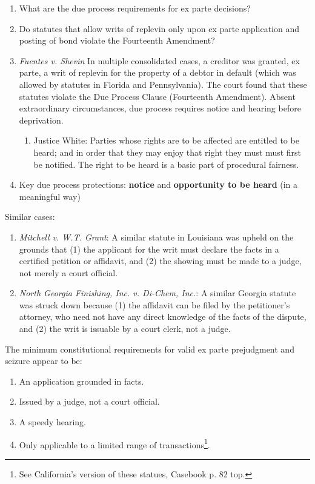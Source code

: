 \begin{enumerate}
    \item What are the due process requirements for ex parte decisions?
    \item Do statutes that allow writs of replevin only upon ex parte 
    application and posting of bond violate the Fourteenth Amendment?
    \item \emph{Fuentes v. Shevin} In multiple consolidated cases, a creditor 
    was granted, ex parte, a writ of replevin for the property of a debtor in 
    default (which was allowed by statutes in Florida and Pennsylvania). The 
    court found that these statutes violate the Due Process Clause (Fourteenth 
    Amendment). Absent extraordinary circumstances, due process requires 
    notice and hearing before deprivation.
    \begin{enumerate}
        \item Justice White: Parties whose rights are to be affected are 
        entitled to be heard; and in order that they may enjoy that right they 
        must must first be notified. The right to be heard is a basic part of 
        procedural fairness.
    \end{enumerate}
    \item Key due process protections: \textbf{notice} and \textbf{opportunity 
    to be heard} (in a meaningful way)
\end{enumerate}

Similar cases:

\begin{enumerate}
    \item \emph{Mitchell v. W.T. Grant}: A similar statute in Louisiana was 
    upheld on the grounds that (1) the applicant for the writ must declare the 
    facts in a certified petition or affidavit, and (2) the showing must be 
    made to a judge, not merely a court official.
    \item \emph{North Georgia Finishing, Inc. v. Di-Chem, Inc.}: A similar 
    Georgia statute was struck down because (1) the affidavit can be filed by 
    the petitioner's attorney, who need not have any direct knowledge of the 
    facts of the dispute, and (2) the writ is issuable by a court clerk, not a 
    judge.
\end{enumerate}

The minimum constitutional requirements for valid ex parte prejudgment and 
seizure appear to be:

\begin{enumerate}
    \item An application grounded in facts.
    \item Issued by a judge, not a court official.
    \item A speedy hearing.
    \item Only applicable to a limited range of transactions\footnote{See 
    California's version of these statues, Casebook p. 82 top.}.
\end{enumerate}

